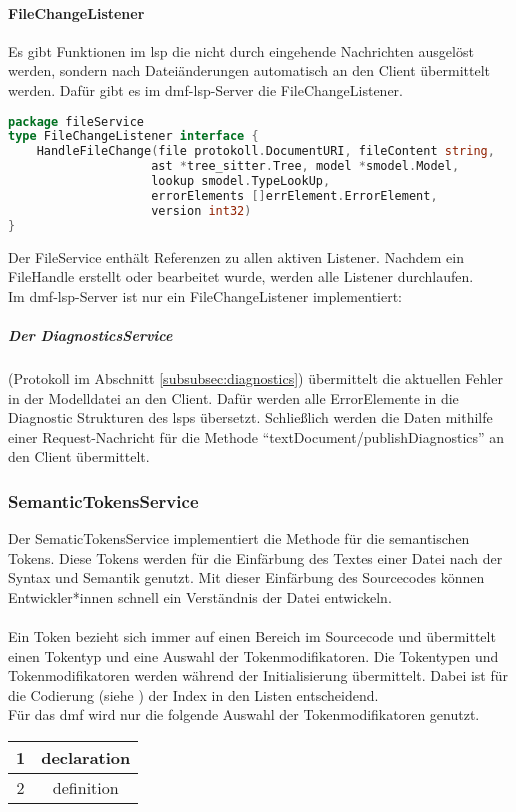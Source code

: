 \documentclass[./einleitung.tex]{subfiles}
\begin{document}
    \paragraph{FileChangeListener}
    Es gibt Funktionen im \acrshort{lsp} die nicht durch eingehende Nachrichten ausgelöst werden, sondern nach Dateiänderungen automatisch an den Client übermittelt werden.
    Dafür gibt es im \acrshort{dmf}-\acrshort{lsp}-Server die FileChangeListener.
    \begin{lstlisting}[language=Go]
package fileService
type FileChangeListener interface {
	HandleFileChange(file protokoll.DocumentURI, fileContent string,
                    ast *tree_sitter.Tree, model *smodel.Model,
                    lookup smodel.TypeLookUp,
                    errorElements []errElement.ErrorElement,
                    version int32)
}
    \end{lstlisting}
    Der FileService enthält Referenzen zu allen aktiven Listener.
    Nachdem ein FileHandle erstellt oder bearbeitet wurde, werden alle Listener durchlaufen.\\
    Im \acrshort{dmf}-\acrshort{lsp}-Server ist nur ein FileChangeListener implementiert:
    \subparagraph[DiagnosticsService]{Der DiagnosticsService }\label{subsubsec:diagnostics-service}
    (Protokoll im Abschnitt \ref{subsubsec:diagnostics})
    übermittelt die aktuellen Fehler in der Modelldatei an den Client.
    Dafür werden alle ErrorElemente in die Diagnostic Strukturen des \acrshort{lsp}s übersetzt.
    Schließlich werden die Daten mithilfe einer Request-Nachricht für die Methode ``textDocument/publishDiagnostics'' an den Client übermittelt.

    \subsubsection{SemanticTokensService }\label{subsubsec:semantic-service}
    Der SematicTokensService implementiert die Methode für die semantischen Tokens.
    Diese Tokens werden für die Einfärbung des Textes einer Datei nach der Syntax und Semantik genutzt.
    Mit dieser Einfärbung des Sourcecodes können Entwickler*innen schnell ein Verständnis der Datei entwickeln.
    \\\\
    Ein Token bezieht sich immer auf einen Bereich im Sourcecode und übermittelt einen Tokentyp und eine Auswahl der Tokenmodifikatoren.
    Die Tokentypen und Tokenmodifikatoren werden während der Initialisierung übermittelt.
    Dabei ist für die Codierung (siehe ) der Index in den Listen entscheidend. \\
    Für das \acrshort{dmf} wird nur die folgende Auswahl der Tokenmodifikatoren genutzt.
    \begin{center}
        \begin{tabular}{|c|c|}
            1 & declaration \\
            \hline
            2 & definition
        \end{tabular}
    \end{center}
\end{document}
